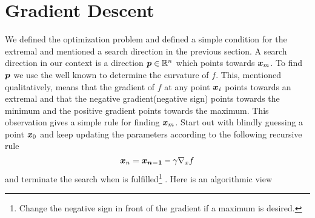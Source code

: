 \section{Gradient Descent\label{sec:gradient_descent}}
    We defined the optimization problem and defined a simple condition for the
    extremal and mentioned a search direction in the previous section. A search
    direction in our context is a direction $\boldsymbol{{p}}\in\mathbb{R}^n$ which
    points towards $\boldsymbol{{x}}_m$. To find $\boldsymbol{{p}}$ we use the well known
     to determine the curvature of $f$. This,
    mentioned qualitatively, means that the gradient of $f$ at any point
    $\boldsymbol{{x}}_i$ points towards an extremal and that the negative
    gradient(negative sign) points towards the minimum and the positive
    gradient points towards the maximum. This observation gives a simple rule
    for finding $\boldsymbol{{x}}_m$. Start out with blindly guessing a point
    $\boldsymbol{{x}}_0$ and keep updating the parameters according to the following
    recursive rule
        \begin{equation}
            \boldsymbol{{x}}_n = \boldsymbol{{x_{n-1}}} - \gamma\nabla_{x} f
            \label{eq:gdupdate}
        \end{equation}
    and terminate the search when  is
    fulfilled\footnote{Change the negative sign in front of the gradient if a
    maximum is desired.} \cite{numOptNocWrig}. Here is an algorithmic view
